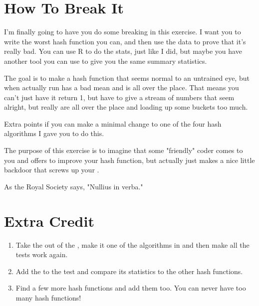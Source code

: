 \section{How To Break It}

I'm finally going to have you do some breaking in this exercise.  I want
you to write the worst hash function you can, and then use the data to 
prove that it's really bad.  You can use R to do the stats, just like
I did, but maybe you have another tool you can use to give you the same
summary statistics.

The goal is to make a hash function that seems normal to an untrained 
eye, but when actually run has a bad mean and is all over the place.
That means you can't just have it return 1, but have to give a stream
of numbers that seem alright, but really are all over the place and
loading up some buckets too much.

Extra points if you can make a minimal change to one of the four 
hash algorithms I gave you to do this.

The purpose of this exercise is to imagine that some "friendly" coder
comes to you and offers to improve your hash function, but actually
just makes a nice little backdoor that screws up your .

As the Royal Society says, "Nullius in verba."

\section{Extra Credit}

\begin{enumerate}
\item Take the  out of the , make it
    one of the algorithms in  and then make all
    the tests work again.
\item Add the  to the  
    test and compare its statistics to the other hash functions.
\item Find a few more hash functions and add them too. You can never have too
    many hash functions!
\end{enumerate}


